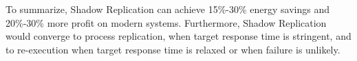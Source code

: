 
To summarize, Shadow Replication can achieve 15\%-30\% energy savings and 20\%-30\% more profit on modern systems\cite{cui_closer_2014}. Furthermore, Shadow Replication would converge to process replication, when target response time is stringent, and to re-execution when target response time is relaxed or when failure is unlikely.
